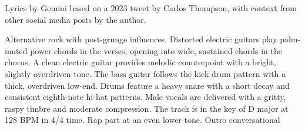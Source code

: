 

\begin{notes}
Lyrics by Gemini based on a 2023 tweet by Carlos Thompson, with context from other social media posts by the author.
\end{notes}
\begin{style}
Alternative rock with post-grunge influences. %
Distorted electric guitars play palm-muted power chords in the verses, opening into wide, sustained chords in the chorus. %
A clean electric guitar provides melodic counterpoint with a bright, slightly overdriven tone. %
The bass guitar follows the kick drum pattern with a thick, overdriven low-end. %
Drums feature a heavy snare with a short decay and consistent eighth-note hi-hat patterns. %
Male vocals are delivered with a gritty, raspy timbre and moderate compression. %
The track is in the key of D major at 128 BPM in 4/4 time. %
Rap part at an even lower tone. %
Outro conversational
\end{style}
